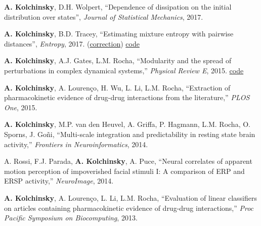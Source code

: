 \textbf{A. Kolchinsky}, D.H. Wolpert, ``Dependence of dissipation on the initial distribution over states'', \emph{Journal of Statistical Mechanics}, 2017.   

\textbf{A. Kolchinsky}, B.D. Tracey, ``Estimating mixture entropy with pairwise distances'', \emph{Entropy}, 2017. (\href{https://www.mdpi.com/1099-4300/19/11/588}{correction})  \href{https://github.com/btracey/mixent/}{code} 

\textbf{A. Kolchinsky}, A.J. Gates, L.M. Rocha, ``Modularity and the spread of perturbations in complex dynamical systems,'' \emph{Physical Review E}, 2015. 
\href{https://github.com/artemyk/perturbationmodularity/}{code} 

\textbf{A. Kolchinsky}, A. Lourenço, H. Wu, L. Li, L.M. Rocha, ``Extraction of pharmacokinetic evidence of drug-drug interactions
from the literature,'' \emph{PLOS One}, 2015.  

\textbf{A. Kolchinsky}, M.P. van den Heuvel, A. Griffa, P. Hagmann, L.M. Rocha, O. Sporns, J. Goñi, ``Multi-scale integration and predictability in resting state brain activity,'' \emph{Frontiers in Neuroinformatics}, 2014.  

A. Rossi, F.J. Parada, \textbf{A. Kolchinsky}, A. Puce, ``Neural correlates of apparent motion perception of impoverished facial stimuli I: A comparison of ERP and ERSP activity,'' \emph{NeuroImage}, 2014.  

\textbf{A. Kolchinsky}, A. Lourenço, L. Li, L.M. Rocha, ``Evaluation of linear classifiers on articles containing pharmacokinetic evidence of drug-drug interactions,'' \emph{Proc Pacific Symposium on Biocomputing}, 2013.  

